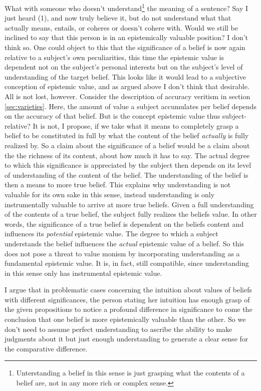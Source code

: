 \documentclass[12pt,numbers=noenddot]{scrartcl}
\begin{document}
What with someone who doesn't understand\footnote{Unterstanding a belief in this sense is just grasping what the contents of a belief are, not in any more rich or complex sense.} the meaning of a sentence? Say I just heard (1), and now truly believe it, but do not understand what that actually means, entails, or coheres or doesn't cohere with. Would we still be inclined to say that this person is in an epistemically valuable position? I don't think so. 
One could object to this that the significance of a belief is now again relative to a subject's own peculiarities, this time the epistemic value is dependent not on the subject's personal interests but on the subject's level of understanding of the target belief. This looks like it would lead to a subjective conception of epistemic value, and as argued above I don't think that desirable. All is not lost, however. Consider the description of accuracy veritism in section \ref{sec:varieties}. Here, the amount of value a subject accumulates per belief depends on the accuracy of that belief. But is the concept epistemic value thus subject-relative? It is not, I propose, if we take what it means to completely grasp a belief to be constituted in full by what the content of the belief \emph{actually} is fully realized by. So a claim about the significance of a belief would be a claim about the the richness of its content, about how much it has to say. The actual degree to which this significance is appreciated by the subject then depends on its level of understanding of the content of the belief. The understanding of the belief is then a means to more true belief. This explains why understanding is not valuable for its own sake in this sense, instead understanding is only instrumentally valuable to arrive at more true beliefs. Given a full understanding of the contents of a true belief, the subject fully realizes the beliefs value. In other words, the significance of a true belief is dependent on the beliefs content and influences its \emph{potential} epistemic value. The degree to which a subject understands the belief influences the \emph{actual} epistemic value of a belief. So this does not pose a threat to value monism by incorporating understanding as a fundamental epistemic value. It is, in fact, still compatible, since understanding in this sense only has instrumental epistemic value.

I argue that in problematic cases concerning the intuition about values of beliefs with different significances, the person stating her intuition has enough grasp of the given propositions to notice a profound difference in significance to come the conclusion that one belief is more epistemically valuable than the other. So we don't need to assume perfect understanding to ascribe the ability to make judgments about it but just enough understanding to generate a clear sense for the comparative difference.
\end{document}
